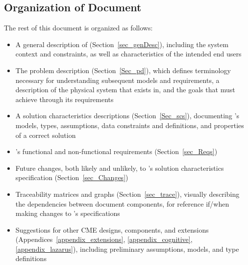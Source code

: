 \subsection{Organization of Document}\label{sec:doc_org}
The rest of this document is organized as follows:
\begin{itemize}
    \item A general description of \progname{} (Section~\ref{sec_genDesc}),
    including the system context and constraints, as well as characteristics of
    the intended end users

    \item The problem description (Section~\ref{Sec_pd}), which defines
    terminology necessary for understanding subsequent models and requirements,
    a description of the physical system that \progname{} exists in, and the
    goals that \progname{} must achieve through its requirements

    \item A solution characteristics descriptions (Section~\ref{Sec_scs}),
    documenting \progname{}'s models, types, assumptions, data constraints and
    definitions, and properties of a correct solution

    \item \progname{}'s functional and non-functional requirements
    (Section~\ref{sec_Reqs})

    \item Future changes, both likely and unlikely, to \progname{}'s solution
    characteristics specification (Section~\ref{sec_Changes})

    \item Traceability matrices and graphs (Section~\ref{sec_trace}), visually
    describing the dependencies between document components, for reference
    if/when making changes to \progname{}'s specifications

    \item Suggestions for other CME designs, components, and extensions
    (Appendices~\ref{appendix_extensions}, \ref{appendix_cognitive},
    \ref{appendix_lazarus}), including preliminary assumptions, models, and
    type definitions
\end{itemize}